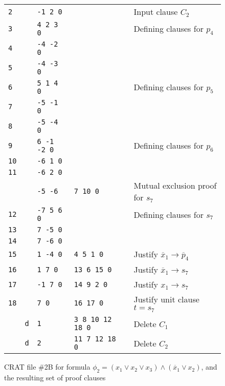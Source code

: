 \documentclass{llncs}
\newcommand{\obar}[1]{\overline{#1}}
\begin{document}
\begin{figure}
\begin{center}
\begin{tabular}{llllll}
    {\tt 2} &    & {\tt -1 2 0}  &            & & Input clause $C_2$ \\
    {\tt 3} &   & {\tt 4 2 3 0} &     & & Defining clauses for $p_4$ \\
    {\tt 4} &   & {\tt -4 -2 0} &     & & \\
    {\tt 5} &   & {\tt -4 -3 0} &     & & \\
    {\tt 6} &   & {\tt 5 1 4 0} &     & & Defining clauses for $p_5$ \\
    {\tt 7} &   & {\tt -5 -1 0} &     & & \\
    {\tt 8} &   & {\tt -5 -4 0} &     & & \\
    {\tt 9} &   & {\tt 6 -1 -2 0}&     & & Defining clauses for $p_6$ \\ 
    {\tt 10} &   & {\tt -6 1 0}    &  & & \\
    {\tt 11} &   & {\tt -6 2 0}    &  & & \\ 
     &           & {\tt -5 -6}   & {\tt 7 10 0}  & & Mutual exclusion proof for $s_7$ \\
    {\tt 12} &   & {\tt -7 5 6 0}  &     & & Defining clauses for $s_7$ \\ 
    {\tt 13} &   & {\tt  7 -5 0}    &  & & \\  
    {\tt 14} &   & {\tt  7 -6 0}    &  & & \\
    {\tt 15} &   & {\tt 1 -4 0}    & {\tt 4 5 1 0} & & Justify $\obar{x}_1 \rightarrow \obar{p}_4$ \\
    {\tt 16} &   & {\tt 1 7 0}     & {\tt 13 6 15 0} & & Justify $\obar{x}_1 \rightarrow s_7$ \\
    {\tt 17} &   & {\tt -1 7 0}    & {\tt 14 9 2 0} & & Justify $x_1 \rightarrow s_7$ \\
    {\tt 18} &   & {\tt 7 0}       & {\tt 16 17 0}  & & Justify unit clause $t = s_7$ \\
             & {\tt d}  & {\tt 1}         & {\tt 3 8 10 12 18 0} & & Delete $C_1$\\
             & {\tt d}  & {\tt 2}         & {\tt 11 7 12 18 0} & & Delete $C_2$\\
  \end{tabular}
  \end{center}  
  \caption{CRAT file \#2B for formula $\phi_2 = (x_1 \lor x_2 \lor x_3) \land (\obar{x}_1 \lor x_2)$, and the resulting set of proof clauses}
  \label{fig:p2-cdcl:crat}
\end{figure}
\end{document}
